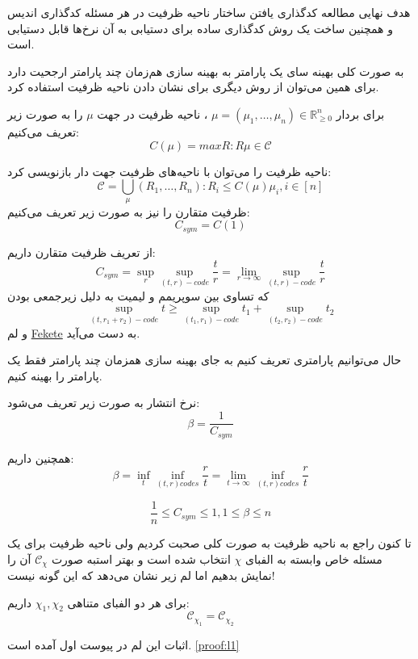 	هدف نهایی  مطالعه کدگذاری یافتن ساختار ناحیه ظرفیت در هر مسئله کدگذاری اندیس و همچنین ساخت یک روش کدگذاری ساده برای دستیابی به آن نرخ‌ها قابل دستیابی است.
	
	به صورت کلی بهینه سای یک پارامتر به بهینه سازی هم‌زمان چند پارامتر ارجحیت دارد برای همین می‌توان از روش دیگری برای نشان دادن ناحیه ظرفیت استفاده کرد.
	\begin{definition}
	برای بردار
	$\mu = (\mu_1, \ldots, \mu_n) \in \mathbb{R}_{\geqslant 0}^n $
	، ناحیه ظرفیت در جهت
	$\mu$
	را به صورت زیر تعریف می‌کنیم:
	$$C(\mu) = max {R: R \mu \in \mathscr{C}}$$
\end{definition}

\begin{remark}
	ناحیه ظرفیت را می‌توان با ناحیه‌های ظرفیت جهت دار بازنویسی کرد:
	$$\mathscr{C} = \bigcup\limits_{\mu} {(R_1, \ldots, R_n): R_i \leq C(\mu) \mu_i, i \in [n]}$$
	ظرفیت متقارن را نیز به صورت زیر تعریف می‌کنیم:
	$$C_{sym} = C(1) $$
\end{remark}

از تعریف ظرفیت متقارن داریم:
$$C_{sym}= \sup\limits_{r} \sup_{(t, r)-code} \dfrac{t}{r} = \lim\limits_{r \rightarrow \infty} \sup_{(t, r)-code} \dfrac{t}{r} $$
که تساوی بین سوپریمم و لیمیت به دلیل زیرجمعی بودن
$$\sup_{(t, r_1 + r_2)-code} t \geqslant \sup_{(t_1, r_1)-code} t_1 + \sup_{(t_2, r_2)-code} t_2$$
و لم
\href{https://en.wikipedia.org/wiki/Subadditivity}{Fekete}
به دست می‌آید.

حال می‌توانیم پارامتری تعریف کنیم به جای بهینه سازی همزمان چند پارامتر فقط یک پارامتر را بهینه کنیم.
\begin{definition}
	نرخ انتشار به صورت زیر تعریف می‌شود:
	$$\beta = \dfrac{1}{C_{sym}}$$
\end{definition}
همچنین داریم:
$$\beta = \inf\limits_{t} \inf\limits_{(t, r) codes} \dfrac{r}{t} = \lim\limits_{t \rightarrow \infty} \inf\limits_{(t, r) codes} \dfrac{r}{t}$$

\begin{remark}
	$$\dfrac{1}{n} \leq C_{sym} \leq 1, 1 \leq \beta \leq n$$
\end{remark}
تا کنون راجع به ناحیه ظرفیت به صورت کلی صحبت کردیم ولی ناحیه ظرفیت برای یک مسئله خاص وابسته به الفبای
$\chi$
انتخاب شده است و بهتر استبه صورت
$\mathscr{C}_\chi$
آن را نمایش بدهیم اما لم زیر نشان می‌دهد که این گونه نیست!
\begin{lemma}
	برای هر دو الفبای متناهی
	$\chi_1, \chi_2$
	داریم:
	$$\mathscr{C}_{\chi_1 }= \mathscr{C}_{\chi_2} $$
\end{lemma}
اثبات این لم در پیوست اول آمده است.
\ref{proof:l1}

